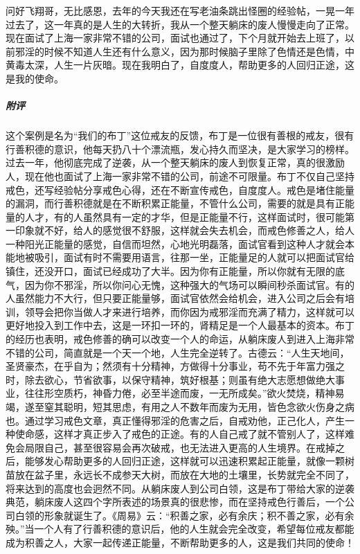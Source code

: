 \begin{case}
    问好飞翔哥，无比感恩，去年的今天我还在写老油条跳出怪圈的经验帖，一晃一年过去了，这一年真的是人生的大转折，我从一个整天躺床的废人慢慢走向了正常。现在面试了上海一家非常不错的公司，面试也通过了，下个月就开始去上班了，以前邪淫的时候不知道人生还有什么意义，因为那时候脑子里除了色情还是色情，中黄毒太深，人生一片灰暗。现在我明白了，自度度人，帮助更多的人回归正途，这是我的使命。
    \subparagraph{附评} 这个案例是名为“我们的布丁”这位戒友的反馈，布丁是一位很有善根的戒友，很有行善积德的意识，他每天扔八十个漂流瓶，发心持久而坚决，是大家学习的榜样。过去一年，他彻底完成了逆袭，从一个整天躺床的废人到恢复正常，真的很激励人，现在他也面试了上海一家非常不错的公司，前途不可限量。布丁不仅自己坚持戒色，还写经验帖分享戒色心得，还在不断宣传戒色，自度度人。戒色是堵住能量的漏洞，而行善积德就是在不断积累正能量，不管什么公司，需要的就是具有正能量的人才，有的人虽然具有一定的才华，但是正能量不行，这样面试时，很可能第一印象就不好，给人的感觉很不舒服，这样就会失去机会，而戒色修善之人，给人一种阳光正能量的感觉，自信而坦然，心地光明磊落，面试官看到这种人才就会本能地被吸引，面试有时不需要用语言，往那一坐，正能量足的人就可以把面试官给镇住，还没开口，面试已经成功了大半。因为你有正能量，所以你就有无限的底气，因为你不邪淫，所以你问心无愧，这种强大的气场可以瞬间秒杀面试官。有的人虽然能力不大行，但只要正能量够，面试官依然会给机会，进入公司之后会有培训，领导会把你当做人才来进行培养，而你因为戒邪淫而充满了精力，这样就可以更好地投入到工作中去，这是一环扣一环的，肾精足是一个人最基本的资本。布丁的经历也表明，戒色修善的确可以改变一个人的命运，从躺床废人到进入上海非常不错的公司，简直就是一个天一个地，人生完全逆转了。古德云：“人生天地间，圣贤豪杰，在乎自为；然须有十分精神，方做得十分事业，苟不先于年富力强之时，除去欲心，节省欲事，以保守精神，筑好根基；则虽有绝大志愿想做绝大事业，往往形空质朽，神昏力倦，必至半途而废，一无所成矣。”欲火焚烧，精神易竭，遂至窒其聪明，短其思虑，有用之人不数年而废为无用，皆色念欲火伤身之病也。通过学习戒色文章，真正懂得邪淫的危害之后，自戒劝他，正己化人，产生一种使命感，这样才真正步入了戒色的正途。有的人自己戒了就不管别人了，这样难免会局限自己，甚至很容易会再次破戒，也无法进入更高的人生境界。在戒掉之后，能够发心帮助更多的人回归正途，这样就可以迅速积累起正能量，就像一颗树苗放在盆子里，永远长不成参天大树，而放在大地的土壤里，长势就完全不同了，将来达到的高度也会迥然不同。从躺床废人到公司白领，这是布丁带给大家的逆袭典范，躺床废人这四个字所表述的场景真的很悲惨，而在坚持戒色行善后，一个公司白领的形象就诞生了。《周易》云：“积善之家，必有余庆；积不善之家，必有余殃。”当一个人有了行善积德的意识后，他的人生就会完全改变，希望每位戒友都能成为积善之人，大家一起传递正能量，不断帮助更多的人，这是我们共同的使命！
\end{case}

